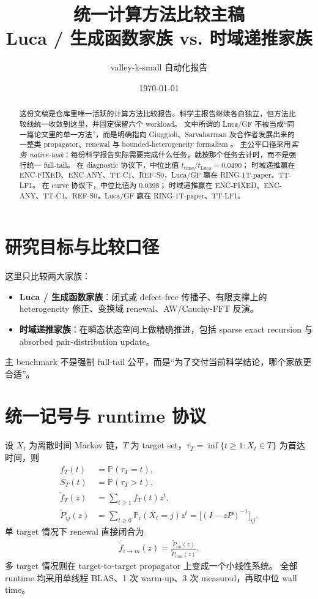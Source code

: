 \documentclass[11pt]{ctexart}
\title{统一计算方法比较主稿\\Luca / 生成函数家族 vs. 时域递推家族}
\author{valley-k-small 自动化报告}
\date{\today}
\begin{document}
\maketitle
\begin{abstract}
这份文稿是仓库里唯一活跃的计算方法比较报告。科学主报告继续各自独立，但方法比较线统一收敛到这里，并固定保留六个 workload。 
文中所谓的 Luca/GF 不被当成“同一篇论文里的单一方法”，而是明确指向 Giuggioli、Sarvaharman 及合作者发展出来的一整类 propagator、renewal 与 bounded-heterogeneity formalism \cite{pre102_062124_2020,prr5_043281_2023,jstat_013201_2023,review_2311_00464_2023}。 
主公平口径采用\emph{实务 native-task}：每份科学报告实际需要完成什么任务，就按那个任务去计时，而不是强行统一 full-tail。 
在 diagnostic 协议下，中位比值 $t_{\mathrm{time}}/t_{\mathrm{Luca}}=0.0490$；
时域递推赢在 ENC-FIXED、ENC-ANY、TT-C1、REF-S0，Luca/GF 赢在 RING-1T-paper、TT-LF1。 
在 curve 协议下，中位比值为 0.0398；
时域递推赢在 ENC-FIXED、ENC-ANY、TT-C1、REF-S0，Luca/GF 赢在 RING-1T-paper、TT-LF1。
\end{abstract}
\section{研究目标与比较口径}
这里只比较两大家族：
\begin{itemize}[leftmargin=1.4em]
\item \textbf{Luca / 生成函数家族}：闭式或 defect-free 传播子、有限支撑上的 heterogeneity 修正、变换域 renewal、AW/Cauchy-FFT 反演。
\item \textbf{时域递推家族}：在瞬态状态空间上做精确推进，包括 sparse exact recursion 与 absorbed pair-distribution update。
\end{itemize}
主 benchmark 不是强制 full-tail 公平，而是“为了交付当前科学结论，哪个家族更合适”。
\section{统一记号与 runtime 协议}
设 $X_t$ 为离散时间 Markov 链，$T$ 为 target set，$\tau_T=\inf\{t\ge 1:X_t\in T\}$ 为首达时间，则
\begin{align}
f_T(t) &= \mathbb P(\tau_T=t),\\
S_T(t) &= \mathbb P(\tau_T>t),\\
\widetilde f_T(z) &= \sum_{t\ge 1} f_T(t) z^t,\\
\widetilde P_{ij}(z) &= \sum_{t\ge 0} \mathbb P_i(X_t=j) z^t = \bigl[(I-zP)^{-1}\bigr]_{ij}.
\end{align}
单 target 情况下 renewal 直接闭合为
\begin{align}
\widetilde f_{i\to m}(z)=\frac{\widetilde P_{im}(z)}{\widetilde P_{mm}(z)}.
\end{align}
多 target 情况则在 target-to-target propagator 上变成一个小线性系统。 
全部 runtime 均采用单线程 BLAS、1 次 warm-up、3 次 measured，再取中位 wall time。
\end{document}
